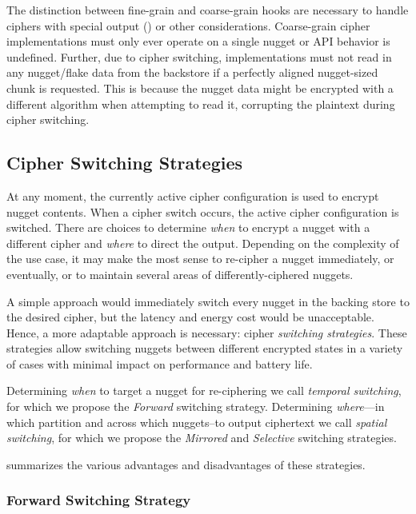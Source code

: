 The distinction between fine-grain and coarse-grain hooks are necessary to
handle ciphers with special output () or other considerations. Coarse-grain cipher
implementations must only ever operate on a single nugget or API behavior is
undefined. Further, due to cipher switching, implementations must not read in
any nugget/flake data from the backstore if a perfectly aligned nugget-sized
chunk is requested. This is because the nugget data might be encrypted with a
different algorithm when attempting to read it, corrupting the plaintext during
cipher switching.

\subsection{Cipher Switching Strategies} \label{subsec:strategies}

At any moment, the currently active cipher configuration is used to encrypt
nugget contents. When a cipher switch occurs, the active cipher configuration is
switched. There are choices to determine \emph{when} to encrypt a nugget with a
different cipher and \emph{where} to direct the output. Depending on the
complexity of the use case, it may make the most sense to re-cipher a nugget
immediately, or eventually, or to maintain several areas of differently-ciphered
nuggets.

A simple approach would immediately switch every nugget in the backing store to
the desired cipher, but the latency and energy cost would be unacceptable.
Hence, a more adaptable approach is necessary: cipher \emph{switching
strategies}. These strategies allow switching nuggets between different
encrypted states in a variety of cases with minimal impact on performance and
battery life.

Determining \emph{when} to target a nugget for re-ciphering we call
\emph{temporal switching}, for which we propose the \emph{Forward} switching
strategy. Determining \emph{where}---in which partition and across which
nuggets--to output ciphertext we call \emph{spatial switching}, for which we
propose the \emph{Mirrored} and \emph{Selective} switching strategies.

 summarizes the various advantages and
disadvantages of these strategies.

\subsubsection{Forward Switching Strategy}

